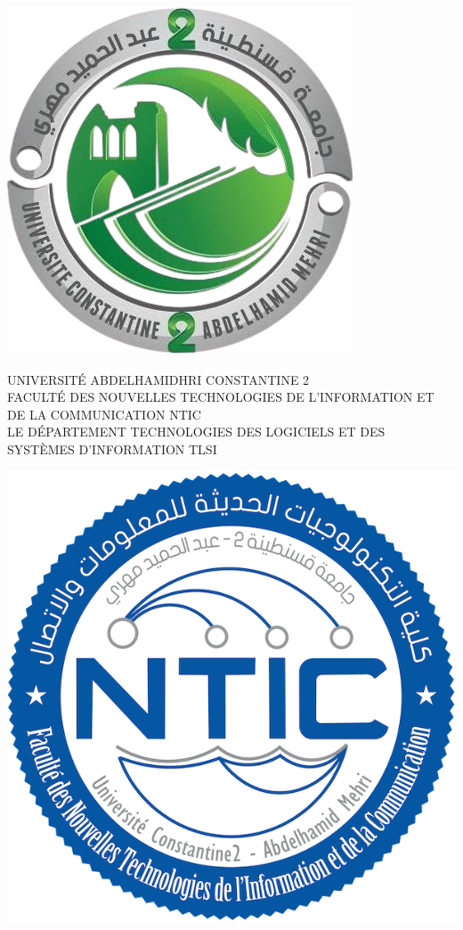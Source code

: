 \documentclass[12pt,a4paper]{article}
\begin{document}
\begin{titlepage}
    \begin{minipage}{0.15\textwidth}
        \includegraphics[width=\linewidth]{university-logo.png}
    \end{minipage}
    \begin{minipage}{0.625\textwidth}
        \centering
        \MakeUppercase{
            Université Abdelhamidhri Constantine 2\\
            Faculté des Nouvelles Technologies de l'Information et de la Communication NTIC\\
            Le Département Technologies des Logiciels et des Systèmes d'Information TLSI
        }
    \end{minipage}
    \begin{minipage}{0.15\textwidth}
        \includegraphics[width=\linewidth]{ntic-logo.png}

\end{minipage}
\end{titlepage}
\end{document}
